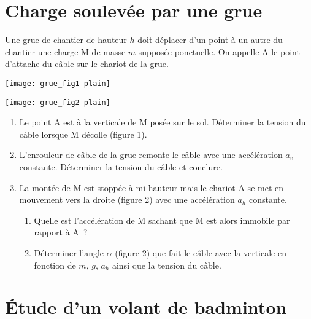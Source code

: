 \documentclass[a4paper, 12pt, final, garamond]{book}
\begin{document}
\section{Charge soulevée par une grue}

Une grue de chantier de hauteur $h$ doit déplacer d'un point à un autre du
chantier une charge M de masse $m$ supposée ponctuelle. On appelle A le point
d'attache du câble sur le chariot de la grue.

\begin{minipage}{0.45\linewidth}
    \begin{center}
        \texttt{[image: grue\_fig1-plain]}
    \end{center}
\end{minipage}
\hfill
\begin{minipage}{0.45\linewidth}
    \begin{center}
        \texttt{[image: grue\_fig2-plain]}
    \end{center}
\end{minipage}

\begin{enumerate}
    \item Le point A est à la verticale de M posée sur le sol. Déterminer la
        tension du câble lorsque M décolle (figure 1).
    \item L'enrouleur de câble de la grue remonte le câble avec une accélération
        $a_v$ constante. Déterminer la tension du câble et conclure.
    \item La montée de M est stoppée à mi-hauteur mais le chariot A se met en
        mouvement vers la droite (figure 2) avec une accélération $a_h$
        constante.
        \begin{enumerate}
            \item Quelle est l'accélération de M sachant que M est alors
                immobile par rapport à A~?
            \item Déterminer l'angle $\alpha$ (figure 2) que fait le câble avec
                la verticale en fonction de $m$, $g$, $a_h$ ainsi que la tension
                du câble.
        \end{enumerate}
\end{enumerate}

\section{Étude d'un volant de badminton}
\end{document}
